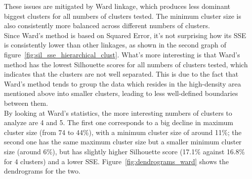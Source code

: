 These issues are mitigated by Ward linkage, which produces less dominant biggest clusters for
all numbers of clusters tested. The minimum cluster size is also consistently more balanced
across different numbers of clusters.\\

Since Ward's method is based on Squared Error, it's not surprising how its SSE is consistently lower than other linkages, as shown in the second graph of figure~\ref{fig:sil_sse_hierarchical_clust}.
What's more interesting is that Ward's method has the lowest Silhouette scores for all numbers
of clusters tested, which indicates that the clusters are not well separated. This is due to
the fact that Ward's method tends to group the data which resides in the high-density area
mentioned above into smaller clusters, leading to less well-defined boundaries between them.\\

By looking at Ward's statistics, the more interesting numbers of clusters to analyze are 4 and 5.
The first one corresponds to a big decline in maximum cluster size (from 74 to 44\%),
with a minimum cluster size of around 11\%; the second one has the same maximum cluster size but a smaller minimum cluster size (around 6\%), but has slightly higher Silhouette score
(17.1\% against 16.8\% for 4 clusters) and a lower SSE. Figure~\ref{fig:dendrograms_ward} shows
the dendrograms for the two.


